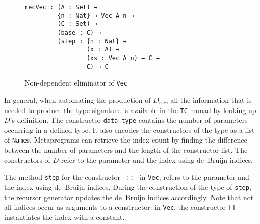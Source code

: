 \documentclass[runningheads]{llncs}
\begin{document}
\begin{figure}
\centering
\begingroup
\fontsize{7.9pt}{8pt}\selectfont
\begin{BVerbatim}
recVec : (A : Set) →
         {n : Nat} → Vec A n →
         (C : Set) →
         (base : C) →
         (step : {n : Nat} →
                 (x : A) →
                 (xs : Vec A n) → C →
                 C) → C

\end{BVerbatim}
\endgroup
\caption{Non-dependent eliminator of {\tt Vec}}
\label{fig:recV}
\end{figure}


In general, when automating the production of $D_{\mathit{rec}}$, all the information that is needed to produce the type signature is available in the \texttt{TC} monad by looking up $D$'s definition.
The constructor {\tt data-type} contains the number of parameters occurring in a defined type. It also encodes the constructors of the type as a list of \texttt{Name}s. Metaprograms can retrieve the index count by finding the difference between the number of parameters and the length of the constructor list. The constructors of $D$ refer to the parameter and the index using de~Bruijn indices.

The method {\tt step} for the constructor {\tt \_::\_} in {\tt Vec}, refers to the parameter and the index using de~Bruijn indices.
During the construction of the type of {\tt step}, the recursor generator updates the de~Bruijn indices accordingly.
Note that not all indices occur as arguments to a constructor: in {\tt Vec}, the constructor {\tt []} instantiates the index with a constant.
\end{document}
